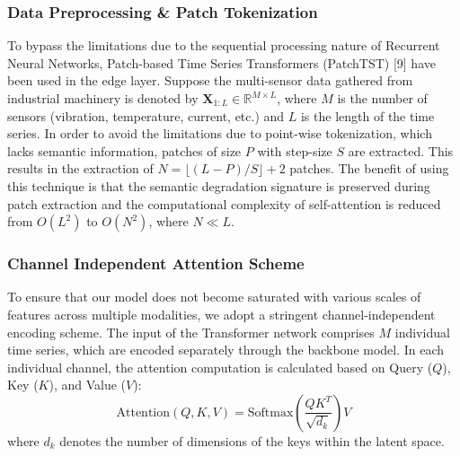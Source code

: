 \documentclass[conference]{IEEEtran}
\begin{document}
\subsubsection{Data Preprocessing \& Patch Tokenization}
To bypass the limitations due to the sequential processing nature of Recurrent Neural Networks, Patch-based Time Series Transformers (PatchTST) [9] have been used in the edge layer. Suppose the multi-sensor data gathered from industrial machinery is denoted by $\mathbf{X}_{1:L} \in \mathbb{R}^{M \times L}$, where $M$ is the number of sensors (vibration, temperature, current, etc.) and $L$ is the length of the time series. In order to avoid the limitations due to point-wise tokenization, which lacks semantic information, patches of size $P$ with step-size $S$ are extracted. This results in the extraction of $N = \lfloor (L - P) / S \rfloor + 2$ patches. The benefit of using this technique is that the semantic degradation signature is preserved during patch extraction and the computational complexity of self-attention is reduced from $O(L^2)$ to $O(N^2)$, where $N \ll L$.

\subsubsection{Channel Independent Attention Scheme}
To ensure that our model does not become saturated with various scales of features across multiple modalities, we adopt a stringent channel-independent encoding scheme. The input of the Transformer network comprises $M$ individual time series, which are encoded separately through the backbone model. In each individual channel, the attention computation is calculated based on Query ($Q$), Key ($K$), and Value ($V$):
\begin{equation}
  \text{Attention}(Q, K, V) = \text{Softmax}\left( \frac{QK^T}{\sqrt{d_k}} \right)V
\end{equation}
where $d_k$ denotes the number of dimensions of the keys within the latent space.
\end{document}
